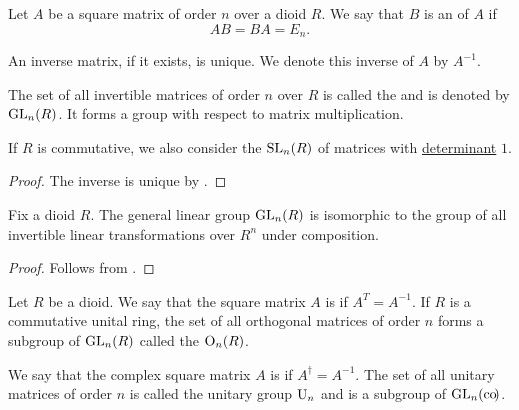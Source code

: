 \begin{definition}\label{def:inverse_matrix}
  Let \( A \) be a square matrix of order \( n \) over a dioid \( R \). We say that \( B \) is an  of \( A \) if
  \begin{equation*}
    AB = BA = E_n.
  \end{equation*}

  An inverse matrix, if it exists, is unique. We denote this inverse of \( A \) by \( A^{-1} \).

  The set of all invertible matrices of order \( n \) over \( R \) is called the  and is denoted by \( \operatorname{GL}_n(R) \). It forms a group with respect to matrix multiplication.

  If \( R \) is commutative, we also consider the  \( \operatorname{SL}_n(R) \) of matrices with \hyperref[def:matrix_determinant]{determinant} \( 1 \).
\end{definition}
\begin{proof}
  The inverse is unique by .
\end{proof}

\begin{proposition}\label{def:general_linear_group_isomorphic_to_automorphism_group}
  Fix a dioid \( R \). The general linear group \( \operatorname{GL}_n(R) \) is isomorphic to the group of all invertible linear transformations over \( R^n \) under composition.
\end{proposition}
\begin{proof}
  Follows from .
\end{proof}

\begin{definition}\label{def:orthogonal_matrix}
  Let \( R \) be a dioid. We say that the square matrix \( A \) is  if \( A^T = A^{-1} \). If \( R \) is a commutative unital ring, the set of all orthogonal matrices of order \( n \) forms a subgroup of \( \operatorname{GL}_n(R) \) called the  \( \operatorname{O}_n(R) \).
\end{definition}

\begin{definition}\label{def:unitary_matrix}
  We say that the complex square matrix \( A \) is  if \( A^\dagger = A^{-1} \). The set of all unitary matrices of order \( n \) is called the unitary group \( \operatorname{U}_n \) and is a subgroup of \( \operatorname{GL}_n(\operatorname{co}\!) \).
\end{definition}


